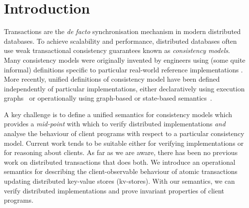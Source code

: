 \section{Introduction}
\label{sec:intro}

Transactions are the \emph{de facto} synchronisation mechanism in
modern distributed databases.  To achieve scalability and performance,
distributed databases often use {weak}  transactional consistency
guarantees known as \emph{consistency models}.  Many consistency
models were originally invented by engineers using (some quite
informal) definitions specific to particular real-world reference
implementations
\cite{tango,CORFU,ramp,rola,cops,wren,redblue,PSI,NMSI,gdur,clocksi,distrsi,PSI-RA,si}.
More recently, unified definitions of consistency model have been
defined independently of particular implementations, either
declaratively using execution graphs~\cite{adya,ev_transactions} or
operationally using graph-based or state-based semantics~\cite{....}.


A key challenge is to define a unified semantics for consistency
models which provides  a {\em mid-point}  with which to 
verify distributed implementations {\em and} analyse the
behaviour of client programs with respect to a particular consistency model. Current
work tends to be suitable  either for verifying implementations or for reasoning
about
clients. As far as we are aware, there has been no
previous work on distributed transactions that does both. 
We introduce an operational semantics for describing the
client-observable behaviour of atomic transactions 
updating distributed key-value stores (kv-stores). With our semantics, we can verify distributed implementations and prove
invariant properties of client programs.  




